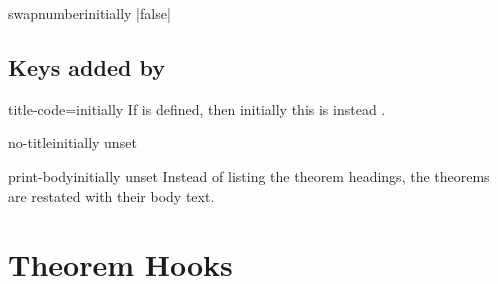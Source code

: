\documentclass{ltxdoc}
\newcommand{\ttbraces}[1]{\braces{\texttt{#1}}}
\begin{document}
\begin{docKey}{swapnumber}{}{initially |false|}

\end{docKey}

\subsection{Keys added by }

\begin{docKey}{title-code}{=}{initially \ttbraces{\#1}}
If  is defined, then initially this is instead \ttbraces{\#1}.
\end{docKey}

\begin{docKey}{no-title}{}{initially unset}

\end{docKey}

\begin{docKey}{print-body}{}{initially unset}
Instead of listing the theorem headings, the theorems are restated with their body text.
\end{docKey}

\section{Theorem Hooks} \label{thmkeys-hooks}
\end{document}
